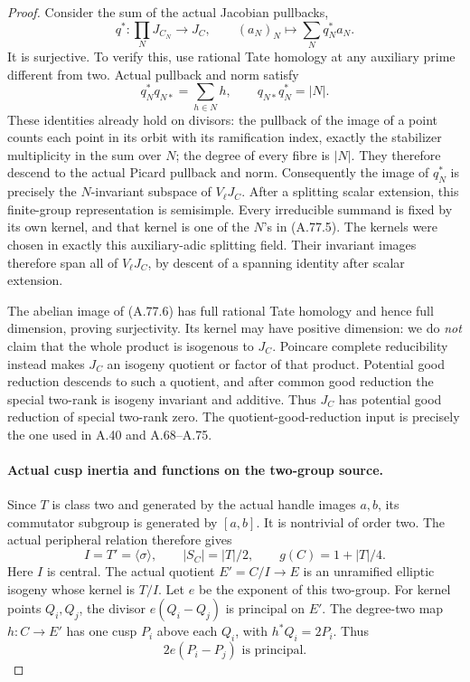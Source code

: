 \begin{proof}
Consider the sum of the actual Jacobian pullbacks,
\[
       q^*:\prod_N J_{C_N}\longrightarrow J_C,
                  \qquad (a_N)_N\longmapsto\sum_Nq_N^*a_N.
                                                        \tag{A.77.6}
\]
It is surjective. To verify this, use rational Tate
homology at any auxiliary prime different from two.
Actual pullback and norm satisfy
\[
                 q_N^*q_{N*}=\sum_{h\in N}h,
          \qquad q_{N*}q_N^*=|N|.                    \tag{A.77.7}
\]
These identities already hold on divisors: the pullback of
 the image of a point counts each point in its orbit with
 its ramification index, exactly the stabilizer multiplicity
 in the sum over \(N\); the degree of every fibre is \(\lvert N\rvert\).
 They therefore descend to the actual Picard pullback and norm.
 Consequently the image of \(q_N^*\) is precisely
the \(N\)-invariant subspace of \(V_\ell J_C\).
After a splitting scalar extension, this finite-group
representation is semisimple. Every irreducible summand
is fixed by its own kernel, and that kernel is one of
the \(N\)'s in (A.77.5). The kernels were chosen in exactly this auxiliary-adic
splitting field. Their invariant images therefore span
all of \(V_\ell J_C\), by descent of a spanning
identity after scalar extension.

The abelian image of (A.77.6) has full rational Tate
homology and hence full dimension, proving surjectivity.
Its kernel may have positive dimension: we do \emph{not}
claim that the whole product is isogenous to \(J_C\).
Poincare complete reducibility instead makes \(J_C\)
an isogeny quotient or factor of that product. Potential
good reduction descends to such a quotient, and after
common good reduction the special two-rank is isogeny
invariant and additive. Thus \(J_C\) has potential
good reduction of special two-rank zero.
The quotient-good-reduction input is precisely the
one used in A.40 and A.68--A.75.
\cite[Corollary 2 to Theorem 1]{fghSerreTate1968}

\paragraph{Actual cusp inertia and functions on the two-group source.}
Since \(T\) is class two and generated by the actual
handle images \(a,b\), its commutator subgroup is
generated by \([a,b]\). It is nontrivial of order
two. The actual peripheral relation therefore gives
\[
 I=T'=\langle\sigma\rangle,
 \qquad |S_C|=|T|/2,
 \qquad g(C)=1+|T|/4.                                 \tag{A.77.8}
\]
Here \(I\) is central. The actual quotient
\(E'=C/I\to E\) is an unramified elliptic isogeny
whose kernel is \(T/I\). Let \(e\) be the exponent
of this two-group. For kernel points \(Q_i,Q_j\),
the divisor \(e(Q_i-Q_j)\) is principal on \(E'\).
The degree-two map \(h:C\to E'\) has one cusp
\(P_i\) above each \(Q_i\), with \(h^*Q_i=2P_i\).
Thus
\[
                        2e(P_i-P_j)\text{ is principal}.
                                                        \tag{A.77.9}
\]


\end{proof}
